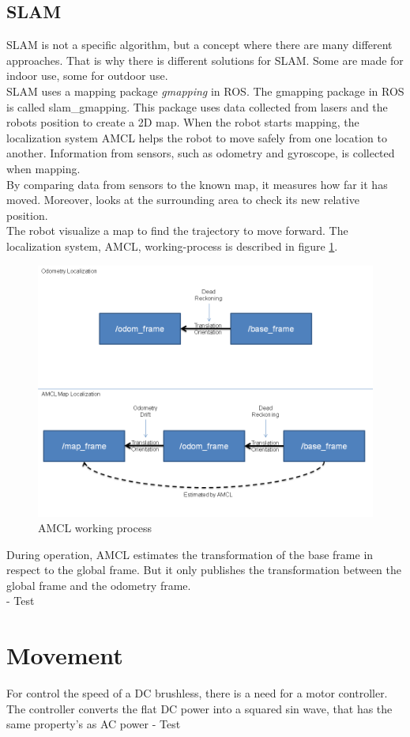 \subsection{SLAM}
SLAM is not a specific algorithm, but a concept where there are many different approaches. That is why there is different solutions for SLAM. Some are made for indoor use, some for outdoor use.\\
SLAM uses a mapping package \textit{gmapping} in ROS. The gmapping package in ROS is called slam\_gmapping. This package uses data collected from lasers and the robots position to create a 2D map. %
When the robot starts mapping, the localization system AMCL helps the robot to move safely from one location to another.
Information from sensors, such as odometry and gyroscope, is collected when mapping. \\
By comparing data from sensors to the known map, it measures how far it has moved. Moreover, looks at the surrounding area to check its new relative position.\\The robot visualize a map to find the trajectory to move forward. The localization system, AMCL, working-process is described in figure \ref{fig:amcl}.

\begin{figure}
    \centering
    \includegraphics[width=.7\textwidth]{figures/AMCL.png}
    \caption{AMCL working process\cite{AMCL}} 
    \label{fig:amcl} 
\end{figure}

 During operation, AMCL estimates the transformation of the base frame in respect to the global frame. But it only publishes the transformation between the global frame and the odometry frame\cite{AMCL}.\\

- Test

%
%
%
%
\section{Movement}
For control the speed of a DC brushless, there is a need for a motor controller. The controller converts the flat DC power into a squared sin wave, that has the same property's as AC power
- Test